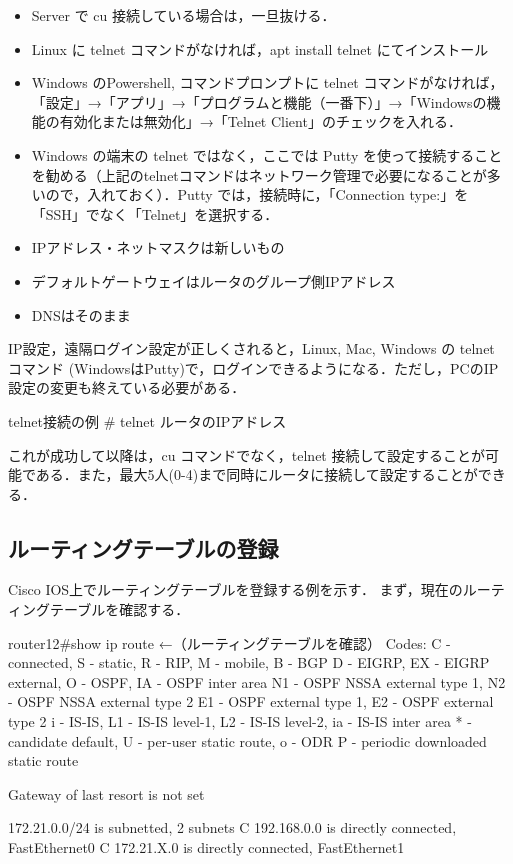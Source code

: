 \begin{itemize}
    \item Server で cu 接続している場合は，一旦抜ける．
    \item Linux に telnet コマンドがなければ，apt install telnet にてインストール
    \item Windows のPowershell, コマンドプロンプトに telnet コマンドがなければ，「設定」→「アプリ」→「プログラムと機能（一番下）」→「Windowsの機能の有効化または無効化」→「Telnet Client」のチェックを入れる．
    \item Windows の端末の telnet ではなく，ここでは Putty を使って接続することを勧める（上記のtelnetコマンドはネットワーク管理で必要になることが多いので，入れておく）．Putty では，接続時に，「Connection type:」を「SSH」でなく「Telnet」を選択する．
    \item IPアドレス・ネットマスクは新しいもの
    \item デフォルトゲートウェイはルータのグループ側IPアドレス
    \item DNSはそのまま
\end{itemize}


IP設定，遠隔ログイン設定が正しくされると，Linux, Mac, Windows の telnet コマンド (WindowsはPutty)で，ログインできるようになる．ただし，PCのIP設定の変更も終えている必要がある．

\begin{cli}
telnet接続の例
# telnet ルータのIPアドレス
\end{cli}

これが成功して以降は，cu コマンドでなく，telnet 接続して設定することが可能である．また，最大5人(0-4)まで同時にルータに接続して設定することができる．

\subsection{ルーティングテーブルの登録}
Cisco IOS上でルーティングテーブルを登録する例を示す．
まず，現在のルーティングテーブルを確認する．

\begin{cli}
router12#show ip route                                    ←（ルーティングテーブルを確認）
Codes: C - connected, S - static, R - RIP, M - mobile, B - BGP
       D - EIGRP, EX - EIGRP external, O - OSPF, IA - OSPF inter area
       N1 - OSPF NSSA external type 1, N2 - OSPF NSSA external type 2
       E1 - OSPF external type 1, E2 - OSPF external type 2
       i - IS-IS, L1 - IS-IS level-1, L2 - IS-IS level-2, ia - IS-IS inter area
       * - candidate default, U - per-user static route, o - ODR
       P - periodic downloaded static route

Gateway of last resort is not set

     172.21.0.0/24 is subnetted, 2 subnets
C       192.168.0.0 is directly connected, FastEthernet0
C       172.21.X.0 is directly connected, FastEthernet1
\end{cli}

